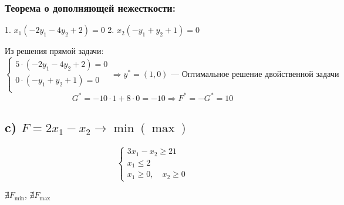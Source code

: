 \documentclass[17pt]{extarticle}
\begin{document}
\subsubsection*{Теорема о дополняющей нежесткости:}
1. \( x_1(-2y_1 - 4y_2 + 2) = 0 \)
2. \( x_2(-y_1 + y_2 + 1) = 0 \)

Из решения прямой задачи:
\[
    \begin{cases}
        5 \cdot (-2y_1 - 4y_2 + 2) = 0 \\
        0 \cdot (-y_1 + y_2 + 1) = 0   \\
    \end{cases}
    \Rightarrow y^* = (1, 0) \text{ — Оптимальное решение двойственной задачи}
\]
\[
    G^* = -10 \cdot 1 + 8 \cdot 0 = -10 \Rightarrow F^* = -G^* = 10
\]

\subsection*{c) \( F = 2x_1 - x_2 \to \min (\max) \)}

\[
    \begin{cases}
        3x_1 - x_2 \geq 21 \\
        x_1 \leq 2         \\
        x_1 \geq 0, \quad x_2 \geq 0
    \end{cases}
\]

\(\nexists F_{\text{min}}\), \(\nexists F_{\text{max}}\)
\end{document}
